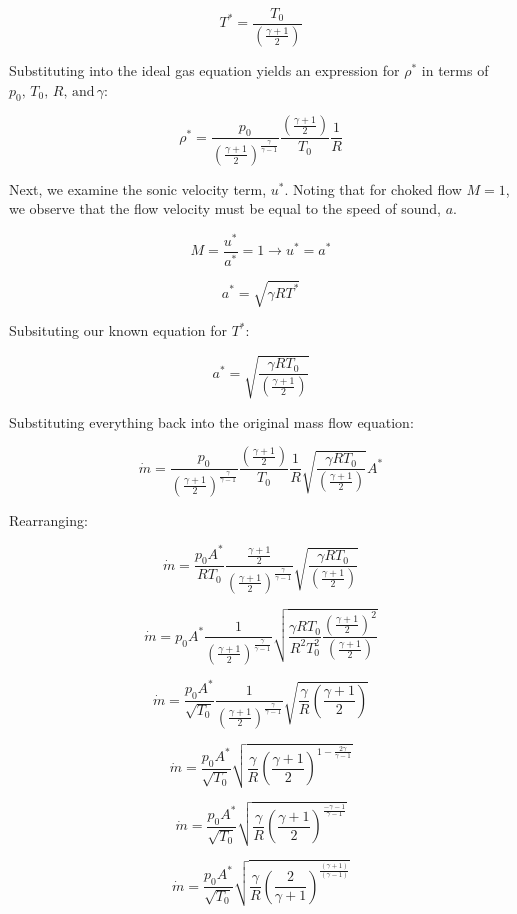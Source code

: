 \documentclass[../main.tex]{subfiles}
\begin{document}
\[
    T^* = \frac{T_0}{\left({
        \frac{\gamma+1}{2}
    }\right)}
\]

Substituting into the ideal gas equation yields an expression for \(\rho^*\) in terms of \(p_0,\, T_0,\, R,\,\textrm{and}\,\gamma\):

\[
    \rho^* =  
    \frac{p_0}{\left({
        \frac{\gamma+1}{2}
    }\right)^{\frac{\gamma}{\gamma-1}}}
    \frac{\left({
        \frac{\gamma+1}{2}
    }\right)}{T_0}
    \frac{1}{R}
\]

Next, we examine the sonic velocity term, \(u^*\).
Noting that for choked flow \(M=1\), we observe that the flow velocity must be equal to the speed of sound, \(a\).

\[
    M = \frac{u^*}{a^*} = 1 \rightarrow u^* = a^*
\]

\[
    a^* = \sqrt{\gamma R T^*}  
\]

Subsituting our known equation for \(T^*\):

\[
    a^* = \sqrt{\frac{\gamma RT_0}{\left({
        \frac{\gamma+1}{2}
    }\right)}}  
\]

Substituting everything back into the original mass flow equation:

\[
    \dot{m} = 
    \frac{p_0}{\left({
        \frac{\gamma+1}{2}
    }\right)^{\frac{\gamma}{\gamma-1}}}
    \frac{\left({
        \frac{\gamma+1}{2}
    }\right)}{T_0}
    \frac{1}{R}
    \sqrt{\frac{\gamma RT_0}{\left({
        \frac{\gamma+1}{2}
    }\right)}}  
    A^*
\]

Rearranging:

\[
    \dot{m}
    =
    \frac{p_0 A^*}{R T_0}
    \frac{\frac{\gamma+1}{2}}{\left({
        \frac{\gamma+1}{2}
    }\right)^{\frac{\gamma}{\gamma-1}}}
    \sqrt{\frac{\gamma RT_0}{\left({
        \frac{\gamma+1}{2}
    }\right)}}  
\]

\[
    \dot{m}
    =
    p_0 A^*
    \frac{1}{\left({
        \frac{\gamma+1}{2}
    }\right)^{\frac{\gamma}{\gamma-1}}}
    \sqrt{\frac{\gamma RT_0}{R^2 T_0^2}\frac{\left({
        \frac{\gamma+1}{2}
    }\right)^2}{\left({
        \frac{\gamma+1}{2}
    }\right)}}  
\]

\[
    \dot{m}
    =
    \frac{p_0 A^*}{\sqrt{T_0}}
    \frac{1}{\left({
        \frac{\gamma+1}{2}
    }\right)^{\frac{\gamma}{\gamma-1}}}
    \sqrt{\frac{\gamma}{R} \left({\frac{\gamma+1}{2}}\right)}
\]

\[
    \dot{m}
    =
    \frac{p_0 A^*}{\sqrt{T_0}}
    \sqrt{\frac{\gamma}{R} \left({\frac{\gamma+1}{2}}\right)^{1-\frac{2\gamma}{\gamma-1}}}
\]

\[
    \dot{m}
    =
    \frac{p_0 A^*}{\sqrt{T_0}}
    \sqrt{\frac{\gamma}{R} \left({\frac{\gamma+1}{2}}\right)^{\frac{-\gamma-1}{\gamma-1}}}
\]

\[
    \boxed{
    \dot{m} = \frac{p_0 A^*}{\sqrt{T_0}} \sqrt{\frac{\gamma}{R} \left({\frac{2}{\gamma+1}}\right)^{\frac{(\gamma+1)}{(\gamma-1)}}}
    }
    \]
\end{document}
